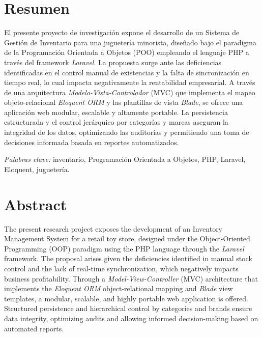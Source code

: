\documentclass[12pt,a4paper]{article}
\begin{document}
\newpage
{}

\tableofcontents
\newpage
\listoftables
\newpage
\listoffigures
\newpage


\section*{Resumen}

El presente proyecto de investigación expone el desarrollo de un Sistema de
Gestión de Inventario para una juguetería minorista, diseñado bajo el
paradigma de la Programación Orientada a Objetos (POO) empleando el lenguaje
PHP a través del framework \emph{Laravel}. La propuesta surge ante las
deficiencias identificadas en el control manual de existencias y la falta de
sincronización en tiempo real, lo cual impacta negativamente la rentabilidad
empresarial. A través de una arquitectura \emph{Modelo-Vista-Controlador}
(MVC) que implementa el mapeo objeto-relacional \emph{Eloquent ORM} y las
plantillas de vista \emph{Blade}, se ofrece una aplicación web modular,
escalable y altamente portable. La persistencia estructurada y el control
jerárquico por categorías y marcas aseguran la integridad de los datos,
optimizando las auditorías y permitiendo una toma de decisiones informada
basada en reportes automatizados.

\emph{Palabras clave:} inventario, Programación Orientada a Objetos, PHP,
Laravel, Eloquent, juguetería.

\newpage

\section*{Abstract}

The present research project exposes the development of an Inventory Management System
for a retail toy store, designed under the Object-Oriented Programming (OOP) paradigm
using the PHP language through the \emph{Laravel} framework. The proposal arises given
the deficiencies identified in manual stock control and the lack of real-time
synchronization, which negatively impacts business profitability. Through a
\emph{Model-View-Controller} (MVC) architecture that implements the \emph{Eloquent ORM}
object-relational mapping and \emph{Blade} view templates, a modular, scalable, and highly
portable web application is offered. Structured persistence and hierarchical control by
categories and brands ensure data integrity, optimizing audits and allowing informed
decision-making based on automated reports.
\end{document}
